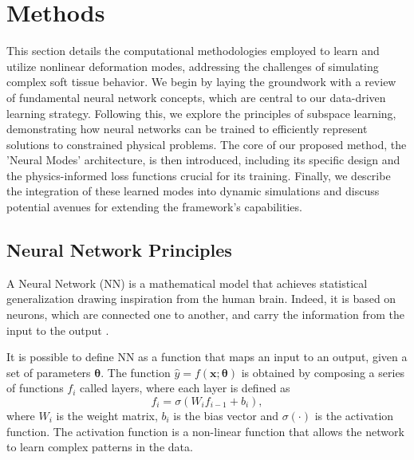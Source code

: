 \section{Methods}
\label{sec:methods}

This section details the computational methodologies employed to learn and utilize nonlinear deformation modes, addressing the challenges of simulating complex soft tissue behavior. We begin by laying the groundwork with a review of fundamental neural network concepts, which are central to our data-driven learning strategy. Following this, we explore the principles of subspace learning, demonstrating how neural networks can be trained to efficiently represent solutions to constrained physical problems. The core of our proposed method, the 'Neural Modes' architecture, is then introduced, including its specific design and the physics-informed loss functions crucial for its training. Finally, we describe the integration of these learned modes into dynamic simulations and discuss potential avenues for extending the framework's capabilities.



\subsection{Neural Network Principles}

A Neural Network (NN) is a mathematical model that achieves statistical generalization drawing inspiration from the human brain. Indeed, it is based on neurons, which are connected one to another, and carry the information from the input to the output \cite{Goodfellow-et-al-2016}.

It is possible to define NN as a function that maps an input to an output, given a set of parameters \( \bm{\theta} \). The function \( \hat{y} = f(\bm{x}; \bm{\theta}) \) is obtained by composing a series of functions \( f_i \) called layers, where each layer is defined as
\begin{equation}
    f_i = \sigma(W_i f_{i-1} + b_i),
\end{equation}
where \( W_i \) is the weight matrix, \( b_i \) is the bias vector and \( \sigma(\cdot) \) is the activation function. The activation function is a non-linear function that allows the network to learn complex patterns in the data. 

